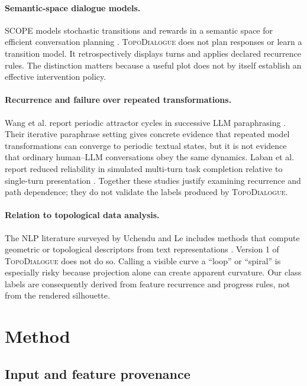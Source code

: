 \documentclass[11pt]{article}
\newcommand{\system}{\textsc{TopoDialogue}}
\begin{document}
\paragraph{Semantic-space dialogue models.}
SCOPE models stochastic transitions and rewards in a semantic space for
efficient conversation planning \citep{chen2025scope}. \system{} does not plan
responses or learn a transition model. It retrospectively displays turns and
applies declared recurrence rules. The distinction matters because a useful
plot does not by itself establish an effective intervention policy.

\paragraph{Recurrence and failure over repeated transformations.}
Wang et al. report periodic attractor cycles in successive LLM paraphrasing
\citep{wang2025attractor}. Their iterative paraphrase setting gives concrete
evidence that repeated model transformations can converge to periodic textual
states, but it is not evidence that ordinary human--LLM conversations obey the
same dynamics. Laban et al. report reduced reliability in simulated multi-turn
task completion relative to single-turn presentation \citep{laban2025lost}.
Together these studies justify examining recurrence and path dependence; they
do not validate the labels produced by \system{}.

\paragraph{Relation to topological data analysis.}
The NLP literature surveyed by Uchendu and Le includes methods that compute
geometric or topological descriptors from text representations
\citep{uchendu2026tda}. Version 1 of \system{} does not do so. Calling a visible
curve a ``loop'' or ``spiral'' is especially risky because projection alone can
create apparent curvature. Our class labels are consequently derived from
feature recurrence and progress rules, not from the rendered silhouette.

\section{Method}

\subsection{Input and feature provenance}
\end{document}
